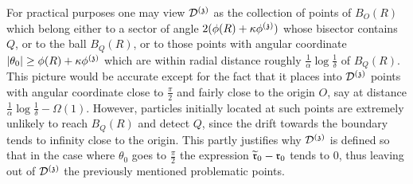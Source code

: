 For practical purposes one may view $\dt$ as the collection of points of $B_O(R)$
which belong either to a sector of angle $2(\phi(R)+\kappa\phi^{(\ss)})$ 
whose bisector contains $Q$, 
or to the ball $B_Q(R)$, or to those points with angular coordinate $|\theta_0|\geq \phi(R)+\kappa\phi^{(\ss)}$ which are 
within radial distance roughly $\frac{1}{\alpha}\log\frac{1}{\delta}$ of $B_Q(R)$. 
This picture would be accurate except for the fact that it places into $\dt$ points with angular coordinate close to $\frac{\pi}{2}$ and fairly close to the origin $O$, say at distance 
$\frac{1}{\alpha}\log\frac{1}{\delta}-\Omega(1)$. 
However, particles initially located at such points are extremely unlikely to reach $B_Q(R)$ and detect $Q$, since the drift towards the boundary tends to infinity close to the origin.
This partly justifies why $\dt$ is defined so that in the case where $\theta_0$ goes to $\frac{\pi}{2}$ the expression $\widetilde{\rabs}_0-\rabs_0$ tends to $0$, thus 
leaving out of $\dt$ the previously mentioned problematic points.


